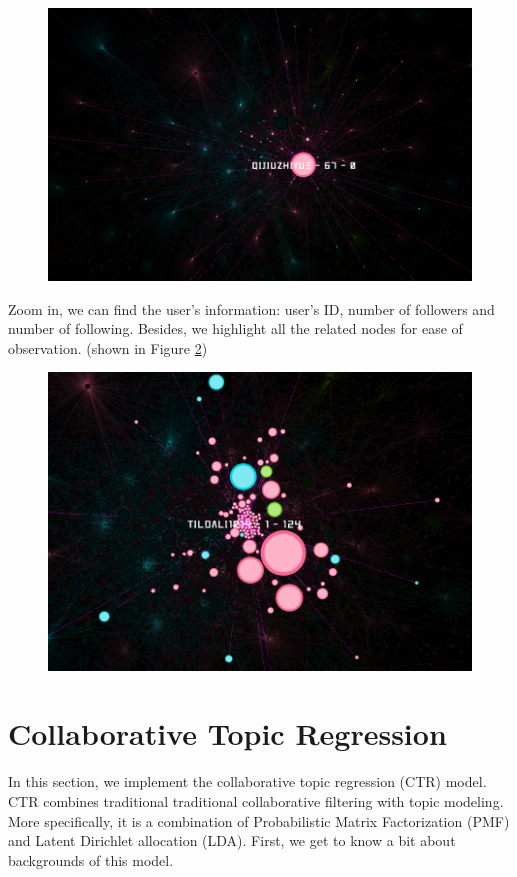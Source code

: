 \documentclass[11pt,a4paper]{article}
\begin{document}
\begin{figure}[ht]
\centering
\includegraphics[width = \columnwidth]{6.png}
\caption{}
\label{6}
\end{figure}

Zoom in, we can find the user's information: user's ID, number of
followers and number of following. Besides, we highlight all the related
nodes for ease of observation. (shown in Figure \ref{4})

\begin{figure}[ht]
\centering
\includegraphics[width = \columnwidth]{4.png}
\caption{}
\label{4}
\end{figure}


\section{Collaborative Topic Regression}
In this section, we implement the collaborative topic regression
(CTR) model\citep{wang2011collaborative}. CTR combines traditional traditional collaborative
filtering with topic modeling. More specifically, it is a combination of Probabilistic Matrix Factorization (PMF) and Latent Dirichlet allocation (LDA). First, we get to know a bit about backgrounds of this model.
\end{document}
